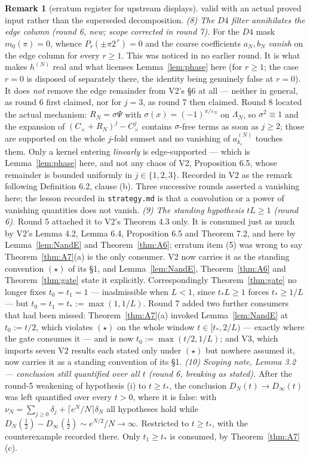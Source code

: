\documentclass[11pt,a4paper]{article}
\theoremstyle{plain}
\theoremstyle{definition}
\newtheorem{remark}[theorem]{Remark}
\newcommand{\eps}{\varepsilon}
\begin{document}
\begin{remark}[erratum register for upstream displays]
valid with an actual proved input rather than the superseded decomposition.
\emph{(8) The $D4$ filter annihilates the edge column (round 6, new; scope corrected
in round 7).} For the $D4$ mask $m_0(\pi)=0$, whence $P_r(\pm\pi2^{\,r})=0$ and the
coarse coefficients $a_N,b_N$ \emph{vanish} on the edge column for every $r\ge1$. This
was noticed in no earlier round. It is what makes $h^{(N)}$ real and what licenses
Lemma~\ref{lem:phase} here (for $r\ge1$; the case $r=0$ is disposed of separately
there, the identity being genuinely false at $r=0$). It does \emph{not} remove the edge remainder from V2's \S6 at all --- neither in
general, as round 6 first claimed, nor for $j=3$, as round 7 then claimed. Round 8
located the actual mechanism: $R_N=\sigma\Psi$ with $\sigma(x)=(-1)^{x/\eps_N}$ on
$\Lambda_N$, so $\sigma^2\equiv1$ and the expansion of $(C_\times+R_N)^j-C_\times^j$
contains $\sigma$-free terms as soon as $j\ge2$; those are supported on the whole
$j$-fold sumset and no vanishing of $a^{(N)}_{k_e}$ touches them. Only a kernel entering
\emph{linearly} is edge-supported --- which is Lemma~\ref{lem:phase} here, and not any
chaos of V2, Proposition 6.5, whose remainder is bounded uniformly in $j\in\{1,2,3\}$.
Recorded in V2 as the remark following Definition 6.2, clause (b). Three successive
rounds asserted a vanishing here; the lesson recorded in \texttt{strategy.md} is that a
convolution or a power of vanishing quantities does not vanish.
\emph{(9) The standing hypothesis $tL\ge1$ (round 6).} Round 5 attached it to V2's
Theorem 4.3 only. It is consumed just as much by V2's Lemma 4.2, Lemma 6.4,
Proposition 6.5 and Theorem 7.2, and here by Lemma~\ref{lem:NandE} and
Theorem~\ref{thm:A6}; erratum item (5) was wrong to say Theorem~\ref{thm:A7}(a) is
the only consumer. V2 now carries it as the standing convention $(\star)$ of its
\S1, and Lemma~\ref{lem:NandE}, Theorem~\ref{thm:A6} and Theorem~\ref{thm:gate}
state it explicitly. Correspondingly Theorem~\ref{thm:gate} no longer fixes
$t_0=t_1=1$ --- inadmissible when $L<1$, since $t_*L\ge1$ forces $t_*\ge1/L$ --- but
$t_0=t_1=t_*:=\max(1,1/L)$. Round 7 added two further consumers that had been missed:
Theorem~\ref{thm:A7}(a) invoked Lemma~\ref{lem:NandE} at $t_0:=t/2$, which violates
$(\star)$ on the whole window $t\in[t_*,2/L)$ --- exactly where the gate consumes it ---
and is now $t_0:=\max(t/2,1/L)$; and V3, which imports seven V2 results each stated only
under $(\star)$ but nowhere assumed it, now carries it as a standing convention of its
\S1.
\emph{(10) Scoping note, Lemma 3.2 --- conclusion still quantified over all $t$
(round 6, breaking as stated).} After the round-5 weakening of hypothesis (i) to
$t\ge t_*$, the conclusion $D_N(t)\to D_\infty(t)$ was left quantified over every
$t>0$, where it is false: with $\nu_N=\sum_{j\ge0}\delta_j+\lceil e^N/N\rceil\delta_N$
all hypotheses hold while $D_N(\tfrac12)-D_\infty(\tfrac12)\sim e^{N/2}/N\to\infty$.
Restricted to $t\ge t_*$, with the counterexample recorded there. Only $t_1\ge t_*$
is consumed, by Theorem~\ref{thm:A7}(c).
\end{remark}
\end{document}
